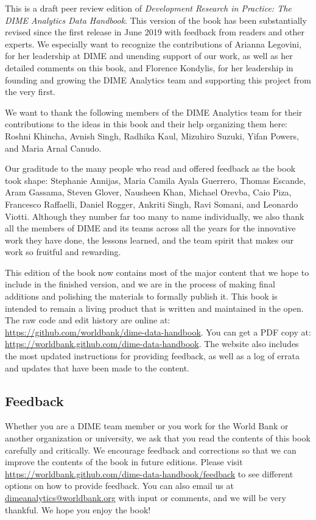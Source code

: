This is a draft peer review edition of
\textit{Development Research in Practice:
The DIME Analytics Data Handbook}.
This version of the book has been substantially revised
since the first release in June 2019
with feedback from readers and other experts.
We especially want to recognize the contributions of
Arianna Legovini, for her leadership at DIME and unending support of our work, 
as well as her detailed comments on this book, and 
Florence Kondylis, for her leadership in founding and growing the DIME Analytics team
and supporting this project from the very first.
 
We want to thank the following members 
of the DIME Analytics team for their contributions 
to the ideas in this book and their help organizing them here: 
Roshni Khincha, Avnish Singh, Radhika Kaul,
Mizuhiro Suzuki, Yifan Powers, and Maria Arnal Canudo.

Our graditude to the many people who read and offered feedback as the book took shape:
Stephanie Annijas,
Maria Camila Ayala Guerrero,
Thomas Escande,
Aram Gassama,
Steven Glover,
Nausheen Khan,
Michael Orevba,
Caio Piza,
Francesco Raffaelli,
Daniel Rogger,
Ankriti Singh,
Ravi Somani,
and Leonardo Viotti.
Although they number far too many to name individually, 
we also thank all the members of DIME and its teams across all the years
for the innovative work they have done, the lessons learned,
and the team spirit that makes our work so fruitful and rewarding.

This edition of the book now contains most of the major content
that we hope to include in the finished version,
and we are in the process of making final additions
and polishing the materials to formally publish it.
This book is intended to remain a living product
that is written and maintained in the open.
The raw code and edit history are online at:
\url{https://github.com/worldbank/dime-data-handbook}.
You can get a PDF copy at:
\url{https://worldbank.github.com/dime-data-handbook}.
The website also includes the most updated instructions
for providing feedback, as well as
a log of errata and updates that have been made to the content.

\subsection{Feedback}

Whether you are a DIME team member or you work for the World Bank
or another organization or university,
we ask that you read the contents of this book carefully and critically.
We encourage feedback and corrections
so that we can improve the contents of the book
in future editions. Please visit
\url{https://worldbank.github.com/dime-data-handbook/feedback} to
see different options on how to provide feedback.
You can also email us at \url{dimeanalytics@worldbank.org}
with input or comments, and we will be very thankful.
We hope you enjoy the book!
